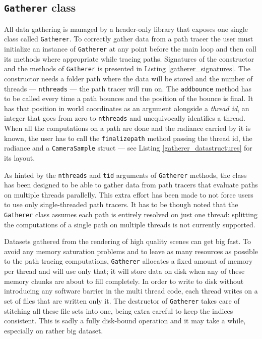 \subsection{\texttt{Gatherer} class}
All data gathering is managed by a header-only library that exposes one single class called \texttt{Gatherer}. To correctly gather data from a path tracer the user must initialize an instance of \texttt{Gatherer} at any point before the main loop and then call its methods where appropriate while tracing paths. Signatures of the constructor and the methods of \texttt{Gatherer} is presented in Listing \ref{gatherer_signatures}.
The constructor needs a folder path where the data will be stored and the number of threads --- \texttt{nthreads} --- the path tracer will run on. The \texttt{addbounce} method has to be called every time a path bounces and the position of the bounce is final. It has that position in world coordinates as an argument  alongside a \textit{thread id}, an integer that goes from zero to \texttt{nthreads} and unequivocally identifies a thread.
When all the computations on a path are done and the radiance carried by it is known, the user has to call the \texttt{finalizepath} method passing the thread id, the radiance and a \texttt{CameraSample} struct --- see Listing \ref{gatherer_datastructures} for its layout.

As hinted by the \texttt{nthreads} and \texttt{tid} arguments of \texttt{Gatherer} methods, the class has been designed to be able to gather data from path tracers that evaluate paths on multiple threads parallelly. This extra effort has been made to not force users to use only single-threaded path tracers. It has to be though noted that the \texttt{Gatherer} class assumes each path is entirely resolved on just one thread: splitting the computations of a single path on multiple threads is not currently supported.

Datasets gathered from the rendering of high quality scenes can get big fast. To avoid any memory saturation problems and to leave as many resources as possible to the path tracing computations, \texttt{Gatherer} allocates a fixed amount of memory per thread and will use only that; it will store data on disk when any of these memory chunks are about to fill completely. In order to write to disk without introducing any software barrier in the multi thread code, each thread writes on a set of files that are written only it. The destructor of \texttt{Gatherer} takes care of stitching all these file sets into one, being extra careful to keep the indices consistent. This is sadly a fully disk-bound operation and it may take a while, especially on rather big dataset.



